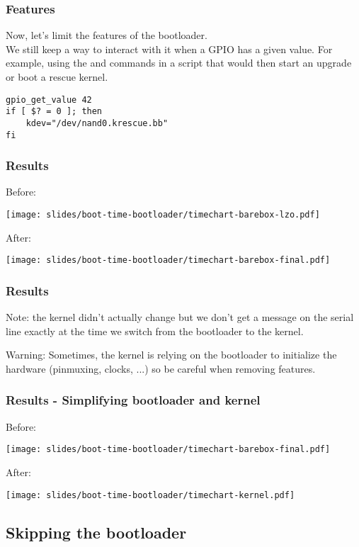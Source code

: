 \begin{frame}[fragile]
\frametitle{Features}
Now, let's limit the features of the bootloader.\\
We still keep a way to interact with it when a GPIO has a given value.
For example, using the  and
 commands in a script that would then start an
upgrade or boot a rescue kernel.
\begin{block}{}
\begin{verbatim}
gpio_get_value 42
if [ $? = 0 ]; then
    kdev="/dev/nand0.krescue.bb"
fi
\end{verbatim}
\end{block}
\end{frame}

\begin{frame}
\frametitle{Results}
Before:
\begin{center}
    \texttt{[image: slides/boot-time-bootloader/timechart-barebox-lzo.pdf]}
\end{center}
After:
\begin{center}
    \texttt{[image: slides/boot-time-bootloader/timechart-barebox-final.pdf]}
\end{center}
\end{frame}

\begin{frame}
\frametitle{Results}
Note: the kernel didn't actually change but we don't get a message on
the serial line exactly at the time we switch from the bootloader to
the kernel.

Warning: Sometimes, the kernel is relying on the bootloader to
initialize the hardware (pinmuxing, clocks, ...) so be careful when
removing features.
\end{frame}

\begin{frame}
\frametitle{Results - Simplifying bootloader and kernel}
Before:
\begin{center}
    \texttt{[image: slides/boot-time-bootloader/timechart-barebox-final.pdf]}
\end{center}
After:
\begin{center}
    \texttt{[image: slides/boot-time-bootloader/timechart-kernel.pdf]}
\end{center}
\end{frame}

\subsection{Skipping the bootloader}

